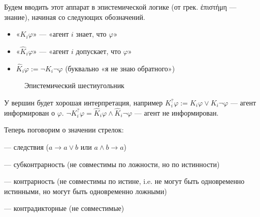 \documentclass[openany]{book}
\theoremstyle{plain}
\theoremstyle{definition}
\begin{document}
Будем вводить этот аппарат в эпистемической логике (от грек. \textgreek{ἐπιστήμη} --- знание), начиная со следующих обозначений.
\begin{itemize}
\item «\(K_i \varphi\)» — «агент \(i\) знает, что \(\varphi\)»
\item «\(\hat{K}_i \varphi\)» — «агент \(i\) допускает, что \(\varphi\)»
\item \(\hat{K}_i \varphi := \neg K_i \neg \varphi\) (буквально «я не знаю обратного»)
\end{itemize}

\begin{figure}
\caption{Эпистемический шестиугольник}
\centering
\end{figure}


У вершин будет хорошая интерпретация, например \(K^{?}_i \varphi := K_i \varphi \lor K_i \neg \varphi\) — агент информирован о \(\varphi\). \(\neg K^{?}_i \varphi = \hat{K}_i \varphi \land \hat{K}_i \neg \varphi\) — агент не информирован.

Теперь поговорим о значении стрелок:
\begin{itemize}
 — следствия (\(a \to a \lor b\) или \(a \land b \to a\))

 — субконтрарность (не совместимы по ложности, но по истинности)

 — контрарность (не совместимы по истине, i.e. не могут быть одновременно истинными, но могут быть одновременно ложными)

 — контрадикторные (не совместимые)
\end{itemize}
\end{document}
